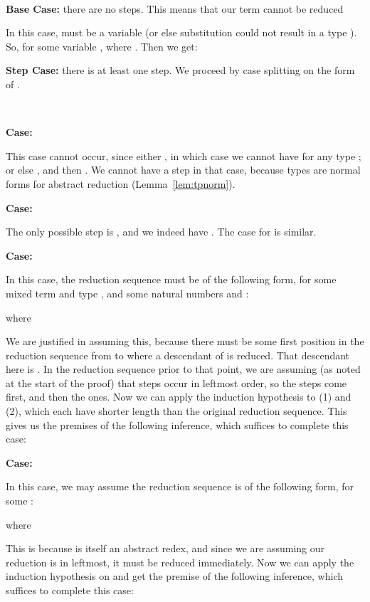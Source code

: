 \documentclass{LMCS}
\begin{document}
\

\noindent \textbf{Base Case:} there are no  steps.
This means that our term  cannot be reduced

\noindent In this case,  must be a variable (or else substitution could not
result in a type ). So,  for some variable , where
. Then we get:


\noindent \textbf{Step Case:}
there is at least one  step.  We proceed by case splitting on the form of .

\

\noindent\textbf{Case:}

\noindent This case cannot occur, since either
, in which case we cannot have
 for any type ; or else
, and then .  We
cannot have a  step in that case, because types are normal
forms for abstract reduction (Lemma~\ref{lem:tpnorm}).

\noindent\textbf{Case:}

\noindent The only possible step is , and we indeed have
.  The case for  is similar.

\noindent\textbf{Case:}

\noindent In this case, the reduction sequence must be of the following form,
for some mixed term  and type , and some natural numbers  and :

\noindent where

\noindent We are justified in assuming this, because there must be
some first position in the reduction sequence from  to 
where a descendant of  is reduced.  That descendant here is
.  In the reduction sequence prior to that point, we
are assuming (as noted at the start of the proof) that steps occur in
leftmost order, so the  steps come first, and then the 
ones.  Now we can apply the induction hypothesis to (1) and (2), which
each have shorter length than the original reduction sequence.  This
gives us the premises of the following inference, which suffices to
complete this case:


\noindent \textbf{Case:}

\noindent In this case, we may assume the reduction sequence is of the
following form, for some :

\noindent where

\noindent This is because  is itself an abstract
redex, and since we are assuming our reduction is in leftmost,
it must be reduced immediately.  Now we can apply the induction
hypothesis on  and get the
premise of the following inference, which suffices to complete this
case:
\end{document}
